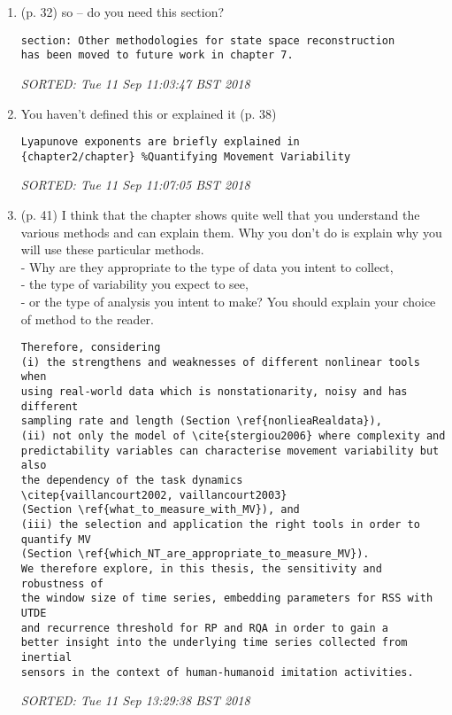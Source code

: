 \documentclass[10pt]{article}
\begin{document}
\begin{enumerate}[noitemsep,topsep=0pt]
\item (p. 32) so -- do you need this section?
\begin{verbatim}
section: Other methodologies for state space reconstruction
has been moved to future work in chapter 7.
\end{verbatim}
\textit{
SORTED: Tue 11 Sep 11:03:47 BST 2018
}
\\




\item You haven't defined this or explained it (p. 38)
\begin{verbatim}
Lyapunove exponents are briefly explained in 
{chapter2/chapter} %Quantifying Movement Variability
\end{verbatim}
\textit{
SORTED: 
Tue 11 Sep 11:07:05 BST 2018
}
\\






\item (p. 41) I think that the chapter shows quite well 
	that you understand the various methods and can explain them.
	Why you don't do is explain why you will use these particular methods.	
	\\ - Why are they appropriate to the type of data you intent to collect, 
	\\ - the type of variability you expect to see, 
	\\ - or the type of analysis you intent to make?
	You should explain your choice of method to the reader.




\begin{verbatim}
Therefore, considering 
(i) the strengthens and weaknesses of different nonlinear tools when 
using real-world data which is nonstationarity, noisy and has different 
sampling rate and length (Section \ref{nonlieaRealdata}),
(ii) not only the model of \cite{stergiou2006} where complexity and 
predictability variables can characterise movement variability but also
the dependency of the task dynamics 
\citep{vaillancourt2002, vaillancourt2003} 
(Section \ref{what_to_measure_with_MV}), and 
(iii) the selection and application the right tools in order to quantify MV
(Section \ref{which_NT_are_appropriate_to_measure_MV}).
We therefore explore, in this thesis, the sensitivity and robustness of 
the window size of time series, embedding parameters for RSS with UTDE 
and recurrence threshold for RP and RQA in order to gain a 
better insight into the underlying time series collected from inertial 
sensors in the context of human-humanoid imitation activities.
\end{verbatim}
\textit{
SORTED: Tue 11 Sep 13:29:38 BST 2018
}
\\



	
\end{enumerate}
\end{document}
